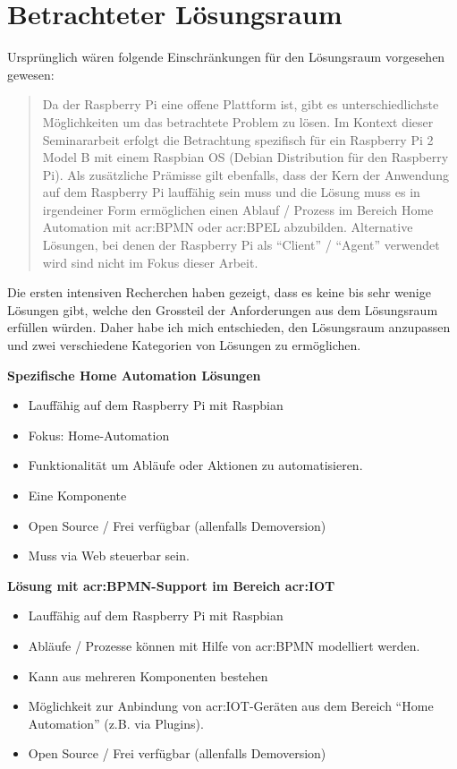 \section{Betrachteter Lösungsraum}
Ursprünglich wären folgende Einschränkungen für den Lösungsraum vorgesehen gewesen:
\blockquote {Da der Raspberry Pi eine offene Plattform ist, gibt es unterschiedlichste Möglichkeiten um das betrachtete Problem zu lösen. Im Kontext dieser Seminararbeit erfolgt die Betrachtung spezifisch für ein Raspberry Pi 2 Model B mit einem Raspbian OS (Debian Distribution für den Raspberry Pi). Als zusätzliche Prämisse gilt ebenfalls, dass der Kern der Anwendung auf dem Raspberry Pi lauffähig sein muss und die Lösung muss es in irgendeiner Form ermöglichen einen Ablauf / Prozess im Bereich Home Automation mit \gls{acr:BPMN} oder \gls{acr:BPEL} abzubilden. Alternative Lösungen, bei denen der Raspberry Pi als "`Client"' / "`Agent"' verwendet wird sind nicht im Fokus dieser Arbeit.}

Die ersten intensiven Recherchen haben gezeigt, dass es keine bis sehr wenige Lösungen gibt, welche den Grossteil der Anforderungen aus dem Lösungsraum erfüllen würden. Daher habe ich mich entschieden, den Lösungsraum anzupassen und zwei verschiedene Kategorien von Lösungen zu ermöglichen.

\textbf{Spezifische Home Automation Lösungen}
\begin{itemize}
\item Lauffähig auf dem Raspberry Pi mit Raspbian
\item Fokus: Home-Automation
\item Funktionalität um Abläufe oder Aktionen zu automatisieren.
\item Eine Komponente
\item Open Source / Frei verfügbar (allenfalls Demoversion)
\item Muss via Web steuerbar sein.
\end{itemize}

\textbf{Lösung mit \gls{acr:BPMN}-Support im Bereich \gls{acr:IOT}}
\begin{itemize}
\item Lauffähig auf dem Raspberry Pi mit Raspbian
\item Abläufe / Prozesse können mit Hilfe von \gls{acr:BPMN} modelliert werden.
\item Kann aus mehreren Komponenten bestehen
\item Möglichkeit zur Anbindung von \gls{acr:IOT}-Geräten aus dem Bereich "`Home Automation"' (z.B. via Plugins).
\item Open Source / Frei verfügbar (allenfalls Demoversion)
\end{itemize}


